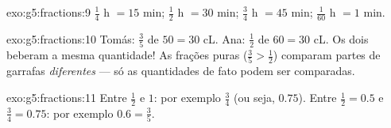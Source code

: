 \begin{solution}{exo:g5:fractions:9}
$\frac14$ h $= 15$ min; $\frac12$ h $= 30$ min; $\frac34$ h $= 45$
min; $\frac{1}{60}$ h $= 1$ min.
\end{solution}

\begin{solution}{exo:g5:fractions:10}
Tomás: $\frac35$ de $50 = 30$ cL. Ana: $\frac12$ de $60 = 30$ cL. Os
dois beberam a mesma quantidade! As frações puras
($\frac35 > \frac12$) comparam partes de garrafas
\emph{diferentes} --- só as quantidades de fato podem ser
comparadas.
\end{solution}

\begin{solution}{exo:g5:fractions:11}
Entre $\frac12$ e $1$: por exemplo $\frac34$ (ou seja, $0.75$). Entre
$\frac12 = 0.5$ e $\frac34 = 0.75$: por exemplo $0.6 = \frac35$.
\end{solution}

